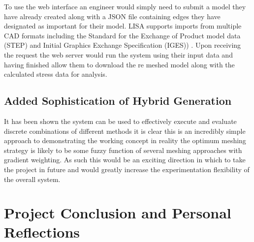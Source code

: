 
\noindent
To use the web interface an engineer would simply need to submit a model they have already created  along with a JSON file containing edges they have designated as important for their model. LISA supports imports from multiple CAD formats including the Standard for the Exchange of Product model data (STEP) and Initial Graphics Exchange Specification (IGES)) \cite{LISAManual}. Upon receiving the request the web server would run the system using their input data and having finished allow them to download the re meshed model along with the calculated stress data for analysis.


\subsection{Added Sophistication of Hybrid Generation}
It has been shown the system can be used to effectively execute and evaluate discrete combinations of different methods it is clear this is an incredibly simple approach to demonstrating the working concept in reality the optimum meshing strategy is likely to be some fuzzy function of several meshing approaches with gradient weighting. As such this would be an exciting direction in which to take the project in future and would greatly increase the experimentation flexibility of the overall system.


\newpage
\section{Project Conclusion and Personal Reflections}


